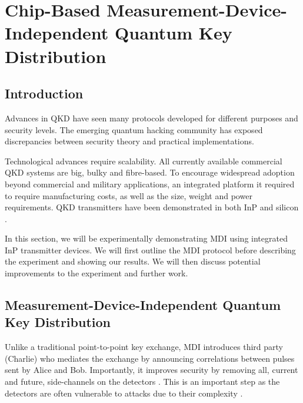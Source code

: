 %
%
\graphicspath{{./chapters/chapter04/fig04/}}

\let\textcircled=\pgftextcircled
\chapter[Chip-Based Measurement-Device-Independent QKD]{Chip-Based Measurement-Device-Independent Quantum Key Distribution}
\label{chap:mdiqkd}

\section{Introduction}

Advances in \ac{QKD} have seen many protocols developed for different purposes and security levels. The emerging quantum hacking community has exposed discrepancies between security theory and practical implementations. 

Technological advances require scalability. All currently available commercial \ac{QKD} systems are big, bulky and fibre-based. To encourage widespread adoption beyond commercial and military applications, an integrated platform it required to require manufacturing costs, as well as the size, weight and power requirements. \ac{QKD} transmitters have been demonstrated in both InP \cite{Sibson2017InP} and silicon \cite{Sibson2017Si}.

In this section, we will be experimentally demonstrating \ac{MDI} \cite{mdi-qkd} using integrated \ac{InP} transmitter devices. We will first outline the \ac{MDI} protocol before describing the experiment and showing our results. We will then discuss potential improvements to the experiment and further work.

\section{Measurement-Device-Independent Quantum Key Distribution}
\label{sec:mdi-qkd}

Unlike a traditional point-to-point key exchange, \ac{MDI} introduces third party (Charlie) who mediates the exchange by announcing correlations between pulses sent by Alice and Bob. Importantly, it improves security by removing all, current and future, side-channels on the detectors \cite{mdi-qkd}. This is an important step as the detectors are often vulnerable to attacks due to their complexity \cite{Lydersen2010a, Makarov2006}.

